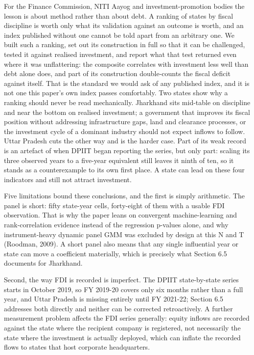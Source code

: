 \documentclass[12pt,a4paper]{article}
\begin{document}
For the Finance Commission, NITI Aayog and investment-promotion bodies the lesson is about method rather than about debt. A ranking of states by fiscal discipline is worth only what its validation against an outcome is worth, and an index published without one cannot be told apart from an arbitrary one. We built such a ranking, set out its construction in full so that it can be challenged, tested it against realised investment, and report what that test returned even where it was unflattering: the composite correlates with investment less well than debt alone does, and part of its construction double-counts the fiscal deficit against itself. That is the standard we would ask of any published index, and it is not one this paper's own index passes comfortably. Two states show why a ranking should never be read mechanically. Jharkhand sits mid-table on discipline and near the bottom on realised investment; a government that improves its fiscal position without addressing infrastructure gaps, land and clearance processes, or the investment cycle of a dominant industry should not expect inflows to follow. Uttar Pradesh cuts the other way and is the harder case. Part of its weak record is an artefact of when DPIIT began reporting the series, but only part: scaling its three observed years to a five-year equivalent still leaves it ninth of ten, so it stands as a counterexample to its own first place. A state can lead on these four indicators and still not attract investment.

Five limitations bound these conclusions, and the first is simply arithmetic. The panel is short: fifty state-year cells, forty-eight of them with a usable FDI observation. That is why the paper leans on convergent machine-learning and rank-correlation evidence instead of the regression p-values alone, and why instrument-heavy dynamic panel GMM was excluded by design at this N and T (Roodman, 2009). A short panel also means that any single influential year or state can move a coefficient materially, which is precisely what Section 6.5 documents for Jharkhand.

Second, the way FDI is recorded is imperfect. The DPIIT state-by-state series starts in October 2019, so FY 2019-20 covers only six months rather than a full year, and Uttar Pradesh is missing entirely until FY 2021-22; Section 6.5 addresses both directly and neither can be corrected retroactively. A further measurement problem affects the FDI series generally: equity inflows are recorded against the state where the recipient company is registered, not necessarily the state where the investment is actually deployed, which can inflate the recorded flows to states that host corporate headquarters.
\end{document}
